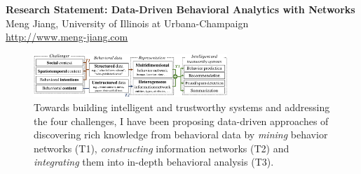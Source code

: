 \documentclass[10.5pt]{article}
\begin{document}
\begin{center}
{\Large \bf Research Statement: Data-Driven Behavioral Analytics with Networks} \\
\vskip 0.05in
{\large Meng Jiang, University of Illinois at Urbana-Champaign} \\
{\url{http://www.meng-jiang.com}}
\vskip -0.1in
\end{center}

\begin{figure}
\vskip -0.18in
\includegraphics[width=0.65\textwidth]{figure/intro.pdf}
\vskip -0.18in
\caption{Towards building intelligent and trustworthy systems and addressing the four challenges, I have been proposing data-driven approaches of discovering rich knowledge from behavioral data by \textit{mining} behavior networks (T1), \textit{constructing} information networks (T2) and \textit{integrating} them into in-depth behavioral analysis (T3).}
\label{fig:intro}
\vskip -0.12in
\end{figure}
\end{document}
